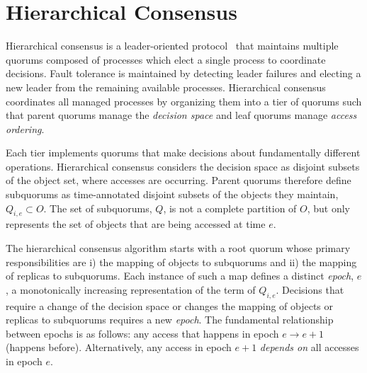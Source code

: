 \documentclass[sigconf]{acmart}
\begin{document}
\section{Hierarchical Consensus}


Hierarchical consensus is a leader-oriented protocol~\cite{ongaro_search_2014} that
maintains multiple quorums composed of processes which elect a single process to
coordinate decisions.
Fault tolerance is maintained by detecting leader failures and electing a new leader from
the remaining available processes.
Hierarchical consensus coordinates all managed processes by organizing them into a tier
of quorums such that parent quorums manage the \emph{decision space} and leaf quorums
manage \emph{access ordering}.

Each tier implements quorums that make decisions about fundamentally different operations.
Hierarchical consensus considers the decision space as disjoint subsets of the object
set, where accesses are occurring.
Parent quorums therefore define subquorums as time-annotated disjoint subsets of the
objects they maintain, $Q_{i,e} \subset O$.
The set of subquorums, $Q$, is not a complete partition of $O$, but only represents the
set of objects that are being accessed at time $e$.


The hierarchical consensus algorithm starts with a root quorum whose primary
responsibilities are i) the mapping of objects to subquorums and ii) the
mapping of replicas to subquorums.
Each instance of such a map defines a distinct \emph{epoch}, $e$, a
monotonically increasing representation of the term of $Q_{i,e}$.
Decisions that require a change of the decision space or changes the
mapping of objects or replicas to subquorums requires a new \emph{epoch}.
The fundamental relationship between epochs is as follows: any access that
happens in epoch $e \rightarrow e+1$ (happens before).
Alternatively, any access in epoch $e+1$ \emph{depends on} all accesses in
epoch $e$.
\end{document}
